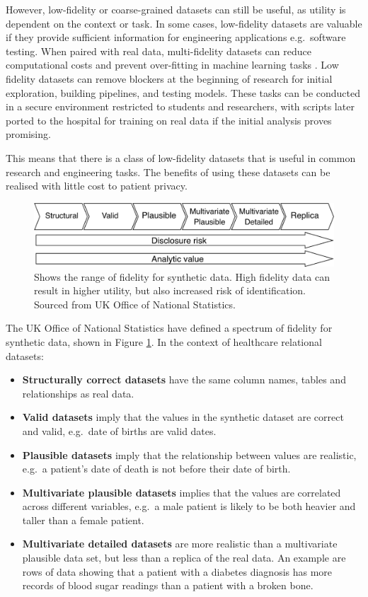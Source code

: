 \documentclass[11pt]{article}
\begin{document}
However, low-fidelity or coarse-grained datasets can still be useful, as utility is dependent on the context or task. In some cases, low-fidelity datasets are valuable if they provide sufficient information for engineering applications e.g.\ software testing. When paired with real data, multi-fidelity datasets can reduce computational costs and prevent over-fitting in machine learning tasks \cite{Patra2020}\cite{Santoni2024}\cite{berkson2019}. Low fidelity datasets can remove blockers at the beginning of research for initial exploration, building pipelines, and testing models. These tasks can be conducted in a secure environment restricted to students and researchers, with scripts later ported to the hospital for training on real data if the initial analysis proves promising.

This means that there is a class of low-fidelity datasets that is useful in common research and engineering tasks. The benefits of using these datasets can be realised with little cost to patient privacy. 

\begin{figure}[ht]
\centering
\includegraphics[width=0.8\linewidth]{figures/ONS.png}
\caption{Shows the range of fidelity for synthetic data. High fidelity data can result in higher utility, but also increased risk of identification. Sourced from UK Office of National Statistics\cite{ONS2021}.
\label{fig:Range of fidelity for synthetic data}}
\end{figure}

The UK Office of National Statistics \cite{ONS2021} have  defined a spectrum of fidelity for synthetic data, shown in Figure \ref{fig:Range of fidelity for synthetic data}. In the context of healthcare relational datasets: 

\begin{itemize}
    \item \textbf{Structurally correct datasets} have the same column names, tables and relationships as real data. 
    \item \textbf{Valid datasets} imply that the values in the synthetic dataset are correct and valid, e.g.\ date of births are valid dates. 
    \item \textbf{Plausible datasets} imply that the relationship between values are realistic, e.g.\ a patient's date of death is not before their date of birth.
    \item \textbf{Multivariate plausible datasets} implies that the values are correlated across different variables, e.g.\ a male patient is likely to be both heavier and taller than a female patient. 
    \item \textbf{Multivariate detailed datasets} are more realistic than a multivariate plausible data set, but less than a replica of the real data. An example are rows of data showing that a patient with a diabetes diagnosis has more records of blood sugar readings than a patient with a broken bone.
\end{itemize}
\end{document}
